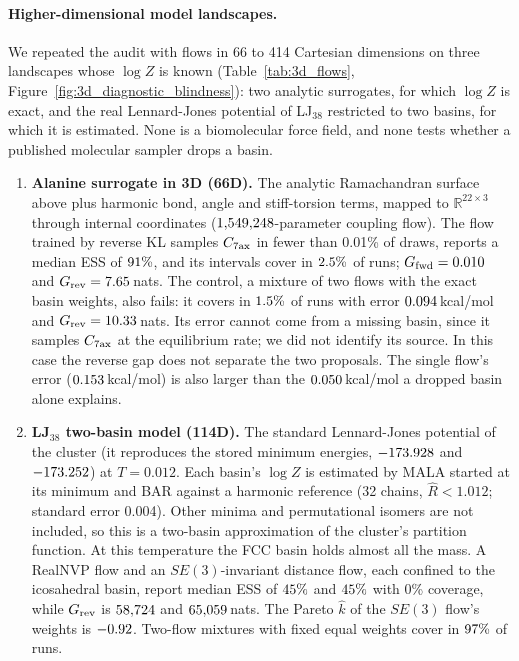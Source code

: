 \paragraph{Higher-dimensional model landscapes.}
We repeated the audit with flows in 66 to 414 Cartesian dimensions on three landscapes whose $\log Z$ is known (Table~\ref{tab:3d_flows}, Figure~\ref{fig:3d_diagnostic_blindness}): two analytic surrogates, for which $\log Z$ is exact, and the real Lennard-Jones potential of LJ$_{38}$ restricted to two basins, for which it is estimated. None is a biomolecular force field, and none tests whether a published molecular sampler drops a basin.
\begin{enumerate}
\item \textbf{Alanine surrogate in 3D (66D).} The analytic Ramachandran surface above plus harmonic bond, angle and stiff-torsion terms, mapped to $\mathbb{R}^{22\times3}$ through internal coordinates ($1{,}549{,}248$-parameter coupling flow). The flow trained by reverse KL samples $C_{7\rm ax}$ in fewer than 0.01\% of draws, reports a median ESS of $91\%$, and its intervals cover in $2.5\%$ of runs; $G_{\rm fwd}=0.010$ and $G_{\rm rev}=7.65$\,nats. The control, a mixture of two flows with the exact basin weights, also fails: it covers in $1.5\%$ of runs with error $0.094$\,kcal/mol and $G_{\rm rev}=10.33$\,nats. Its error cannot come from a missing basin, since it samples $C_{7\rm ax}$ at the equilibrium rate; we did not identify its source. In this case the reverse gap does not separate the two proposals. The single flow's error ($0.153$\,kcal/mol) is also larger than the $0.050$\,kcal/mol a dropped basin alone explains.
\item \textbf{LJ$_{38}$ two-basin model (114D).} The standard Lennard-Jones potential of the cluster (it reproduces the stored minimum energies, $-173.928$ and $-173.252$) at $T=0.012$. Each basin's $\log Z$ is estimated by MALA started at its minimum and BAR against a harmonic reference (32 chains, $\hat R<1.012$; standard error 0.004). Other minima and permutational isomers are not included, so this is a two-basin approximation of the cluster's partition function. At this temperature the FCC basin holds almost all the mass. A RealNVP flow and an $SE(3)$-invariant distance flow, each confined to the icosahedral basin, report median ESS of $45\%$ and $45\%$ with 0\% coverage, while $G_{\rm rev}$ is $58{,}724$ and $65{,}059$\,nats. The Pareto $\hat k$ of the $SE(3)$ flow's weights is $-0.92$. Two-flow mixtures with fixed equal weights cover in $97\%$ of runs.

\end{enumerate}
